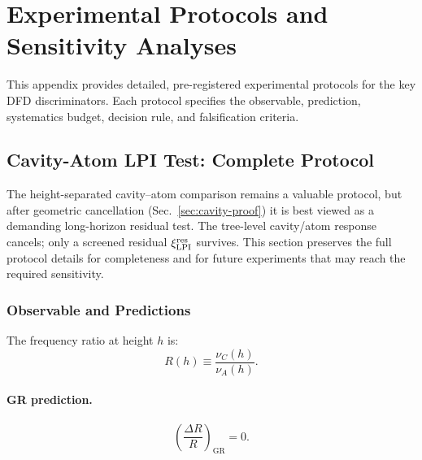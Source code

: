 
\section{Experimental Protocols and Sensitivity Analyses}\label{app:protocols}

This appendix provides detailed, pre-registered experimental protocols for 
the key DFD discriminators. Each protocol specifies the observable, 
prediction, systematics budget, decision rule, and falsification criteria.

\subsection{Cavity-Atom LPI Test: Complete Protocol}\label{app:proto-cavity}

The height-separated cavity--atom comparison remains a valuable protocol, but after geometric cancellation (Sec.~\ref{sec:cavity-proof}) it is best viewed as a demanding long-horizon residual test.  The tree-level cavity/atom response cancels; only a screened residual $\xi_{\rm LPI}^{\rm res}$ survives.  This section preserves the full protocol details for completeness and for future experiments that may reach the required sensitivity.

\subsubsection{Observable and Predictions}

The frequency ratio at height $h$ is:
\begin{equation}
R(h) \equiv \frac{\nu_C(h)}{\nu_A(h)}.
\end{equation}

\paragraph{GR prediction.}
\begin{equation}
\left(\frac{\Delta R}{R}\right)_{\mathrm{GR}} = 0.
\end{equation}


